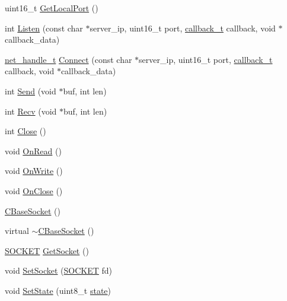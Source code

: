 \begin{DoxyCompactItemize}
\item 
uint16\+\_\+t \hyperlink{class_c_base_socket_af2accbbe419f28919c31b7e5131ae083}{Get\+Local\+Port} ()
\item 
int \hyperlink{class_c_base_socket_aed79eecacc5111f43a459029eebba2dc}{Listen} (const char $\ast$server\+\_\+ip, uint16\+\_\+t port, \hyperlink{msfs_2include_2common_2ostype_8h_a126e68a4e9bb7ecb6c88b2eeb66a0ee7}{callback\+\_\+t} callback, void $\ast$callback\+\_\+data)
\item 
\hyperlink{base_2ostype_8h_a5e1697fa312aa00ac7305460abf166fd}{net\+\_\+handle\+\_\+t} \hyperlink{class_c_base_socket_abd9522218179b5a4a9aa46cafedde0a4}{Connect} (const char $\ast$server\+\_\+ip, uint16\+\_\+t port, \hyperlink{msfs_2include_2common_2ostype_8h_a126e68a4e9bb7ecb6c88b2eeb66a0ee7}{callback\+\_\+t} callback, void $\ast$callback\+\_\+data)
\item 
int \hyperlink{class_c_base_socket_aecaf1a6f668cadf938b6e386d6f274f5}{Send} (void $\ast$buf, int len)
\item 
int \hyperlink{class_c_base_socket_aac275b1f4cbdc77f100c1fb04888ba24}{Recv} (void $\ast$buf, int len)
\item 
int \hyperlink{class_c_base_socket_acc1d5334e2c121a7705e84af536544c9}{Close} ()
\item 
void \hyperlink{class_c_base_socket_afa0c274f4b6d711099f2fca02e0237b9}{On\+Read} ()
\item 
void \hyperlink{class_c_base_socket_ab919914415b76a3441dc9f2cb6a134de}{On\+Write} ()
\item 
void \hyperlink{class_c_base_socket_a18a3b1766f29c232018ec02502240e4f}{On\+Close} ()
\item 
\hyperlink{class_c_base_socket_addf3bf444356a73e1b22b267ffcc3cae}{C\+Base\+Socket} ()
\item 
virtual \hyperlink{class_c_base_socket_ac70630233ba131daf7c710ccb86fe7be}{$\sim$\+C\+Base\+Socket} ()
\item 
\hyperlink{base_2ostype_8h_a8dc8083897335125630f1af5dafd5831}{S\+O\+C\+K\+E\+T} \hyperlink{class_c_base_socket_a67f302722909a6de5740dfa0b99d80f6}{Get\+Socket} ()
\item 
void \hyperlink{class_c_base_socket_ac3d800a30aea0b1c73ebd5d6b9ed8a50}{Set\+Socket} (\hyperlink{base_2ostype_8h_a8dc8083897335125630f1af5dafd5831}{S\+O\+C\+K\+E\+T} fd)
\item 
void \hyperlink{class_c_base_socket_a911c9a90e052e1a1969e046bec4dae8a}{Set\+State} (uint8\+\_\+t \hyperlink{_http_parser_8cpp_adc6e5733fc3c22f0a7b2914188c49c90}{state})

\end{DoxyCompactItemize}

